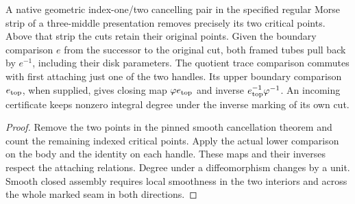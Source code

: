 \begin{proposition}
\label{prop:ed04-native-prefix}
\leanok
A native geometric index-one/two cancelling pair in the specified regular
Morse strip of a three-middle presentation removes precisely its two
critical points. Above that strip the cuts retain their original points.
Given the boundary comparison $e$ from the successor to the original cut,
both framed tubes pull back by $e^{-1}$, including their disk parameters.
The quotient trace comparison commutes with first attaching just one of the
two handles. Its upper boundary comparison $e_{\rm top}$, when supplied,
gives closing map $\varphi e_{\rm top}$ and inverse
$e_{\rm top}^{-1}\varphi^{-1}$. An incoming certificate keeps nonzero
integral degree under the inverse marking of its own cut.
\end{proposition}
\begin{proof}
\leanok
Remove the two points in the pinned smooth cancellation theorem and count
the remaining indexed critical points. Apply the actual lower comparison
on the body and the identity on each handle. These maps and their inverses
respect the attaching relations. Degree under a diffeomorphism changes by
a unit. Smooth closed assembly requires local smoothness in the two
interiors and across the whole marked seam in both directions.
\end{proof}


